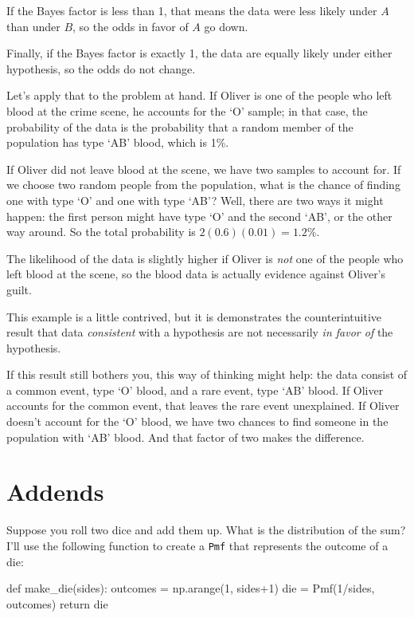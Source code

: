 \documentclass[12pt]{book}
\theoremstyle{exercise}
\newcommand{\py}[1]{{\tt #1}}%
\begin{document}
If the Bayes factor is less than 1, that means the data were
less likely under $A$ than under $B$, so the odds in
favor of $A$ go down.

Finally, if the Bayes factor is exactly 1, the data are equally
likely under either hypothesis, so the odds do not change.

Let's apply that to the problem at hand.  If Oliver is
one of the people who left blood at the crime scene, he
accounts for the `O' sample; in that case, the probability of the data
is the probability that a random member of the population
has type `AB' blood, which is 1\%.

If Oliver did not leave blood at the scene, we have two
samples to account for.  If we choose two random people from
the population, what is the chance of finding one with type `O'
and one with type `AB'?  Well, there are two ways it might happen:
the first person might have type `O' and the second
`AB', or the other way around.  So the total probability is
$2 (0.6) (0.01) = 1.2\%$.

The likelihood of the data is slightly higher if Oliver is
{\it not} one of the people who left blood at the scene, so
the blood data is actually evidence against Oliver's guilt.


This example is a little contrived, but it is demonstrates
the counterintuitive result that data {\it consistent} with
a hypothesis are not necessarily {\it in favor of}
the hypothesis.

If this result still bothers you, this way of thinking might help: the data consist of a common event, type `O' blood, and a rare event, type `AB' blood.
If Oliver accounts for the common event, that leaves the rare
event unexplained.  If Oliver doesn't account for the
`O' blood, we have two chances to find someone in the
population with `AB' blood.  And that factor of two makes
the difference.


\section{Addends}
\label{addends}

Suppose you roll two dice and add them up.  What is the distribution of the sum?
I'll use the following function to create a \py{Pmf} that represents the outcome of a die:

\begin{code}
def make_die(sides):
    outcomes = np.arange(1, sides+1)
    die = Pmf(1/sides, outcomes)
    return die
\end{code}
\end{document}
